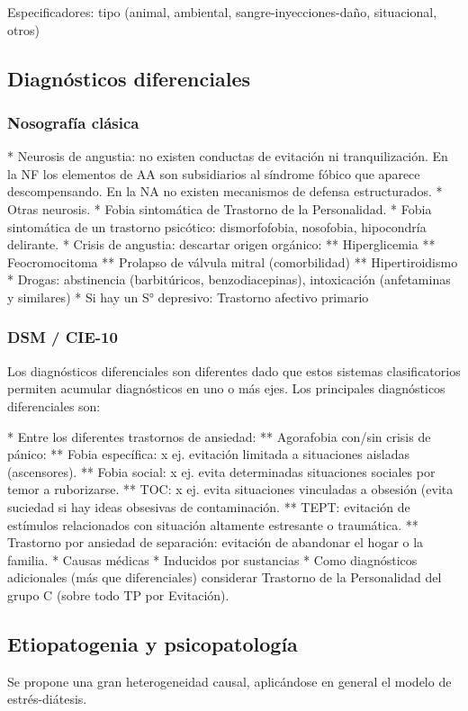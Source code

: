 Especificadores: tipo (animal, ambiental, sangre-inyecciones-daño, situacional, otros)

\subsection*{Diagnósticos diferenciales}
\subsubsection*{Nosografía clásica}
* Neurosis de angustia: no existen conductas de evitación ni tranquilización. En la NF los elementos de AA son subsidiarios al síndrome fóbico que aparece descompensando. En la NA no existen mecanismos de defensa estructurados.
* Otras neurosis.
* Fobia sintomática de Trastorno de la Personalidad.
* Fobia sintomática de un trastorno psicótico: dismorfofobia, nosofobia, hipocondría delirante.
* Crisis de angustia: descartar origen orgánico:
** Hiperglicemia
** Feocromocitoma
** Prolapso de válvula mitral (comorbilidad)
** Hipertiroidismo
* Drogas: abstinencia (barbitúricos, benzodiacepinas), intoxicación (anfetaminas y similares)
* Si hay un S° depresivo: Trastorno afectivo primario
\subsubsection*{DSM / CIE-10}
Los diagnósticos diferenciales son diferentes dado que estos sistemas clasificatorios permiten acumular diagnósticos en uno o más ejes. Los principales diagnósticos diferenciales son:

* Entre los diferentes trastornos de ansiedad:
** Agorafobia con/sin crisis de pánico:
** Fobia específica: x ej. evitación limitada a situaciones aisladas (ascensores).
** Fobia social: x ej. evita determinadas situaciones sociales por temor a ruborizarse.
** TOC: x ej. evita situaciones vinculadas a obsesión (evita suciedad si hay ideas obsesivas de contaminación.
** TEPT: evitación de estímulos relacionados con situación altamente estresante o traumática.
** Trastorno por ansiedad de separación: evitación de abandonar el hogar o la familia.
* Causas médicas
* Inducidos por sustancias
* Como diagnósticos adicionales (más que diferenciales) considerar Trastorno de la Personalidad del grupo C (sobre todo TP por Evitación).
\subsection*{Etiopatogenia y psicopatología}
Se propone una gran heterogeneidad causal, aplicándose en general el modelo de estrés-diátesis.
